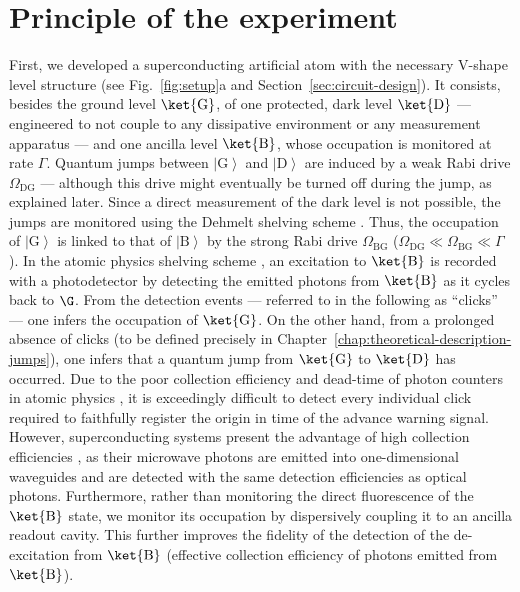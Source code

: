 \section{Principle of the experiment \label{sec:Principle-of-the}}

First, we developed a superconducting artificial atom with the necessary
V-shape level structure (see Fig.~\ref{fig:setup}a and Section~\ref{sec:circuit-design}).
It consists, besides the ground level $\ket{\mathrm{G}}$, of one
protected, dark level $\ket{\mathrm{D}}$ --- engineered to not couple
to any dissipative environment or any measurement apparatus --- and
one ancilla level $\ket{\mathrm{B}}$, whose occupation is monitored
at rate $\Gamma$. Quantum jumps between $\left|\mathrm{G}\right>$
and $\left|\mathrm{D}\right>$ are induced by a weak Rabi drive $\Omega_{\mathrm{DG}}$
--- although this drive might eventually be turned off during the
jump, as explained later. Since a direct measurement of the dark level
is not possible, the jumps are monitored using the Dehmelt shelving
scheme \citep{Nagourney1986}. Thus, the occupation of $\left|\mathrm{G}\right>$
is linked to that of $\left|\mathrm{B}\right>$ by the strong Rabi
drive $\Omega_{\mathrm{BG}}$ ($\Omega_{\mathrm{DG}}\ll\Omega_{\mathrm{BG}}\ll\Gamma$).
In the atomic physics shelving scheme \citep{Nagourney1986,Sauter1986,Bergquist1986},
an excitation to $\ket{\mathrm{B}}$ is recorded with a photodetector
by detecting the emitted photons from $\ket{\mathrm{B}}$ as it cycles
back to $\G$. From the detection events --- referred to in the following
as ``clicks'' --- one infers the occupation of $\ket{\mathrm{G}}$.
On the other hand, from a prolonged absence of clicks (to be defined
precisely in Chapter~\ref{chap:theoretical-description-jumps}),
one infers that a quantum jump from $\ket{\mathrm{G}}$ to $\ket{\mathrm{D}}$
has occurred. Due to the poor collection efficiency and dead-time
of photon counters in atomic physics \citep{Volz2011}, it is exceedingly
difficult to detect every individual click required to faithfully
register the origin in time of  the advance warning signal. However,
superconducting systems present the advantage of high collection efficiencies
\citep{Vijay2012,Riste2013,Murch2013,Weber2014,Roch2014,deLange2014,Campagne2016-Fluorescence},
as their microwave photons are emitted into one-dimensional waveguides
and are detected with the same detection efficiencies as optical photons.
Furthermore, rather than monitoring the direct fluorescence of the
$\ket{\mathrm{B}}$ state, we monitor its occupation by dispersively
coupling it to an ancilla readout cavity. This further improves the
fidelity of the detection of the de-excitation from $\ket{\mathrm{B}}$
(effective collection efficiency of photons emitted from $\ket{\mathrm{B}}$).

